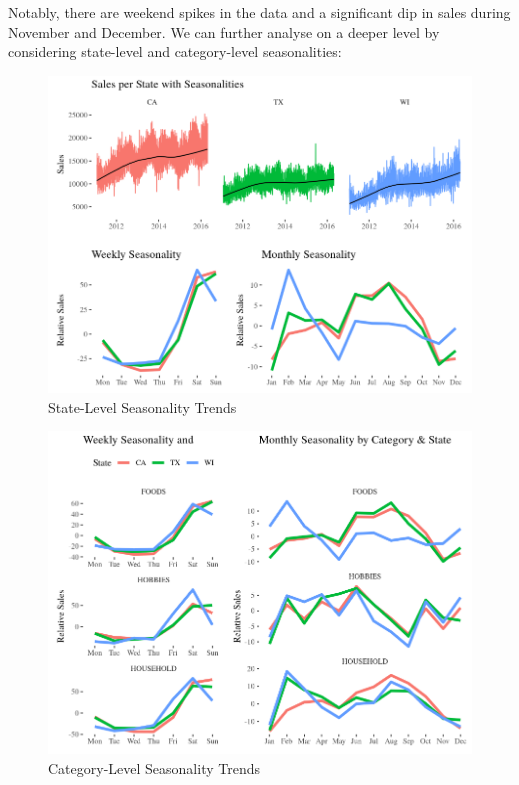 \documentclass[12pt]{article}
\begin{document}
\noindent Notably, there are weekend spikes in the data and a significant dip in sales during November and December. We can further analyse on a deeper level by considering state-level and category-level seasonalities:

\begin{figure}[H]
    \centering
    \includegraphics[width=\textwidth]{Images/stateseasonality.png}
    \caption{State-Level Seasonality Trends}
    \label{fig:6-stateseasonality}
\end{figure} 

\begin{figure}[H]
    \centering
    \includegraphics[width=\textwidth]{Images/categoryseasonality.png}
    \caption{Category-Level Seasonality Trends}
    \label{fig:6-categoryseasonality}
\end{figure} 
\end{document}
